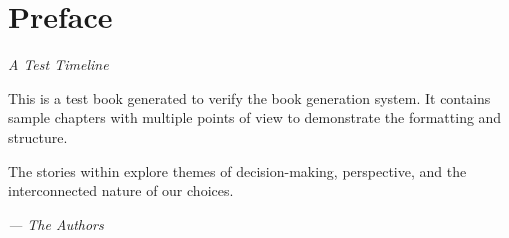 \chapter*{Preface}

\begin{center}
\textit{A Test Timeline}
\end{center}

\vspace{1em}

This is a test book generated to verify the book generation system. It contains sample chapters with multiple points of view to demonstrate the formatting and structure.

\vspace{1em}

The stories within explore themes of decision-making, perspective, and the interconnected nature of our choices.

\vspace{2em}

\begin{flushright}
\textit{--- The Authors}
\end{flushright}
